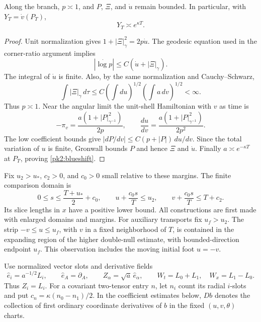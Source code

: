 \begin{lemma}
\label{pk2:branch-normalization}
Along the branch, $p\asymp1$, and $P$, $\Xi$, and $\dot u$ remain
bounded. In particular, with $Y_T=\dot v(P_T)$,
\begin{equation}
 Y_T\asymp e^{\kappa T}.
 \label{pk2:blueshift}
\end{equation}
\end{lemma}
\begin{proof}
Unit normalization gives $1+|\Xi|_\gamma^2=2p\dot u$. The geodesic
equation used in the corner-ratio argument implies
\[
 |\dot{\log p}|\le C(\dot u+|\Xi|_\gamma).
\]
The integral of $\dot u$ is finite. Also, by the same normalization
and Cauchy--Schwarz,
\[
 \int|\Xi|_\gamma\,d\tau
 \le C\left(\int du\right)^{1/2}
          \left(\int a\,dv\right)^{1/2}<\infty.
\]
Thus $p\asymp1$. Near the angular limit the unit-shell Hamiltonian
with $v$ as time is
\begin{equation}
 -\pi_v=\frac{a(1+|P|_{\gamma^{-1}}^2)}{2p},
 \qquad
 \frac{du}{dv}=\frac{a(1+|P|_{\gamma^{-1}}^2)}{2p^2}.
 \label{pk2:branch-hamiltonian}
\end{equation}
The low coefficient bounds give
$|dP/dv|\le C(p+|P|)\,du/dv$. Since the total variation of $u$ is
finite, Gronwall bounds $P$ and hence $\Xi$ and $\dot u$.
Finally $a\asymp e^{-\kappa T}$ at $P_T$, proving
\eqref{pk2:blueshift}.
\end{proof}

Fix $u_2>u_*$, $c_2>0$, and $c_0>0$ small relative to these margins.
The finite comparison domain is
\begin{equation}
 0\le s\le\frac{T+u_*}{2}+c_0,
 \qquad u+\frac{c_0s}{T}\le u_2,
 \qquad v+\frac{c_0s}{T}\le T+c_2.
 \tag{P1}\label{pk2:domain}
\end{equation}
Its slice lengths in $x$ have a positive lower bound. All constructions
are first made with enlarged domains and margins. For auxiliary
transports fix $u_f>u_2$. The strip $-v\le u\le u_f$, with $v$ in a
fixed neighborhood of $T$, is contained in the expanding region of
the higher double-null estimate, with bounded-direction endpoint
$u_f$. This observation includes the moving initial foot $u=-v$.

Use normalized vector slots and derivative fields
\[
 \hat e_i=a^{-1/2}L_i,\qquad \hat e_A=\partial_A,
 \qquad Z_\alpha=\sqrt a\,\hat e_\alpha,
 \qquad W_t=L_0+L_1,\quad W_x=L_1-L_0.
\]
Thus $Z_i=L_i$. For a covariant two-tensor entry $n$, let $n_i$ count
its radial $i$-slots and put $c_n=\kappa(n_0-n_1)/2$.
In the coefficient estimates below, $Db$ denotes the collection of
first ordinary coordinate derivatives of $b$ in the fixed
$(u,v,\theta)$ charts.

